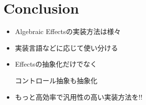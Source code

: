 \section{Conclusion}
\begin{frame}
  \frametitlesec

  \pause
  \begin{itemize}
    \item<+-> Algebraic Effectsの実装方法は様々
    \item<+-> 実装言語などに応じて使い分ける
    \item<+-> Effectsの抽象化だけでなく

      コントロール抽象も抽象化
    \item<+-> もっと高効率で汎用性の高い実装方法を!!
  \end{itemize}
\end{frame}
